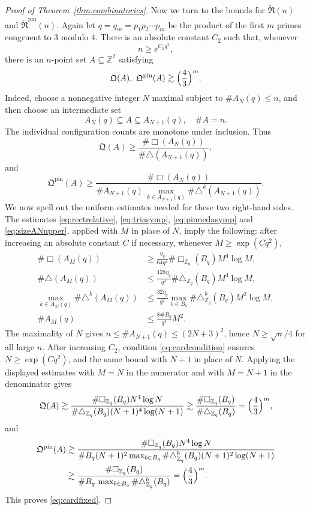 \documentclass[11pt,reqno]{amsart}
\numberwithin{equation}{section}
\renewcommand{\le}{\leqslant}
\renewcommand{\ge}{\geqslant}
\begin{document}
\begin{proof}[Proof of Theorem~\ref{thm:combinatorics}]
Now we turn to the bounds for $\widetilde{\mathfrak{R}}(n)$ and $\widetilde{\mathfrak{R}}^{\mathrm{pin}}(n)$.
Again let $q=q_m=p_1p_2\cdots p_m$ be the product of the first $m$ primes congruent to $3$ modulo $4$. There is an absolute constant $C_2$ such that, whenever
\begin{equation}\label{eq:cardcondition}
n\ge e^{C_2q^2},
\end{equation}
there is an $n$-point set $A\subseteq\mathbb{Z}^2$ satisfying
\begin{equation}\label{eq:cardfixed}
\mathfrak{Q}(A),\ \mathfrak{Q}^{\mathrm{pin}}(A) \gtrsim \Bigl(\frac{4}{3}\Bigr)^m.
\end{equation}
Indeed, choose a nonnegative integer $N$ maximal subject to
$\#A_N(q)\le n$, and then choose an intermediate set
\[ A_N(q)\subseteq A\subseteq A_{N+1}(q), \quad \#A=n. \]
The individual configuration counts are monotone under inclusion. Thus
\[ \mathfrak{Q}(A) \ge \frac{\#\Box(A_N(q))}{\#\triangle(A_{N+1}(q))}, \]
and
\[ \mathfrak{Q}^{\mathrm{pin}}(A) \ge \frac{\#\Box(A_N(q))}{\#A_{N+1}(q)\,\max_{k\in A_{N+1}(q)}\limits \#\triangle^k(A_{N+1}(q))}. \]
We now spell out the uniform estimates needed for these two right-hand sides. The estimates \eqref{eq:rectrelative}, \eqref{eq:triasymp}, \eqref{eq:pinnedasymp} and \eqref{eq:sizeANupper}, applied with $M$ in place of $N$, imply the following: after increasing an absolute constant $C$ if necessary, whenever $M\ge \exp(C q^2)$,
\begin{align*}
\#\Box(A_M(q))
&\ge \frac{\eta_q}{64q^4}\#\Box_{\mathbb{Z}_q}(B_q)M^4\log M,\\
\#\triangle(A_M(q))
&\le \frac{128\eta_q}{q^4}\#\triangle_{\mathbb{Z}_q}(B_q)M^4\log M,\\
\max_{k\in A_M(q)}\#\triangle^k(A_M(q))
&\le \frac{32\eta_q}{q^2}\max_{b\in B_q}\#\triangle^b_{\mathbb{Z}_q}(B_q)M^2\log M,\\
\#A_M(q)
&\le \frac{8\#B_q}{q^2}M^2.
\end{align*}
The maximality of $N$ gives $n\le \#A_{N+1}(q)\le (2N+3)^2$, hence $N\ge \sqrt n/4$ for all large $n$. After increasing $C_2$, condition \eqref{eq:cardcondition} ensures $N\ge\exp(Cq^2)$, and the same bound with $N+1$ in place of $N$. Applying the displayed estimates with $M=N$ in the numerator and with $M=N+1$ in the denominator gives
\[ \mathfrak{Q}(A) \gtrsim \frac{\#\Box_{\mathbb{Z}_q}(B_q)N^4\log N}{\#\triangle_{\mathbb{Z}_q}(B_q)(N+1)^4\log(N+1)}
\gtrsim \frac{\#\Box_{\mathbb{Z}_q}(B_q)}{\#\triangle_{\mathbb{Z}_q}(B_q)}
=\Bigl(\frac43\Bigr)^m, \]
and
\begin{align*}
\mathfrak{Q}^{\mathrm{pin}}(A)
& \gtrsim \frac{\#\Box_{\mathbb{Z}_q}(B_q)N^4\log N}
{\#B_q (N+1)^2 \max_{b\in B_q}\#\triangle^b_{\mathbb{Z}_q}(B_q)(N+1)^2\log(N+1)} \\
&\gtrsim \frac{\#\Box_{\mathbb{Z}_q}(B_q)}{\#B_q\,\max_{b\in B_q}\#\triangle^b_{\mathbb{Z}_q}(B_q)}
=\Bigl(\frac43\Bigr)^m.
\end{align*}
This proves \eqref{eq:cardfixed}.


\end{proof}
\end{document}
